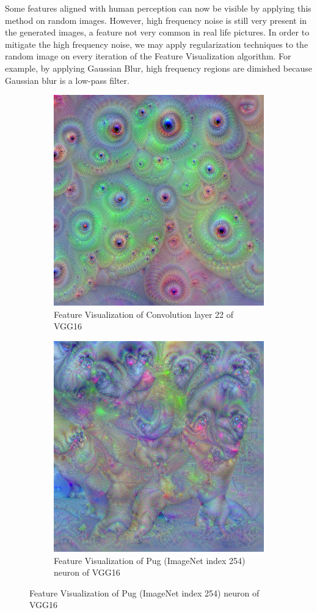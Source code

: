 Some features aligned with human perception can now be visible by applying this method on random images. 
However, high frequency noise is still very present in the generated images, a feature not very common in real life pictures.
In order to mitigate the high frequency noise, we may apply regularization techniques to the random image on every iteration of the Feature Visualization algorithm.
For example, by applying Gaussian Blur, high frequency regions are dimished because Gaussian blur is a low-pass filter.

\begin{figure}
    \captionsetup{justification=centering}

    \begin{subfigure}[t]{0.45\textwidth}
        \captionsetup{justification=centering}
        \centering
        \includegraphics[width=.7\linewidth]{figuras/random_image_dream_reg.png}
        \caption{Feature Visualization of Convolution layer 22 of VGG16}
        \label{fig:feat_conv_L22_reg}
    \end{subfigure}
    \hfill
    \begin{subfigure}[t]{0.45\textwidth}
        \captionsetup{justification=centering}
        \centering
        \includegraphics[width=.7\linewidth]{figuras/random_image_dream_pug_254_reg.png}
        \caption{Feature Visualization of Pug (ImageNet index 254) neuron of VGG16}
        \label{fig:feat_conv_I254_reg}
    \end{subfigure}


\end{figure}
